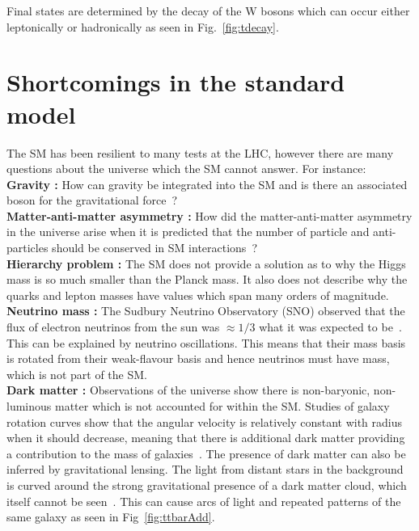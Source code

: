 Final states are determined by the decay of the W bosons which can occur either leptonically or hadronically as seen in Fig.~\ref{fig:tdecay}. 

\section{Shortcomings in the standard model ~\label{sec:SMprobs}}
The SM has been resilient to many tests at the LHC, however there are many questions about the universe which the SM cannot answer. For instance:\\
{\bf Gravity :} How can gravity be integrated into the SM and is there an associated boson for the gravitational force~\cite{PhysRevLett.107.171101,PhysRevD.82.122001}? \\
{\bf Matter-anti-matter asymmetry :} How did the matter-anti-matter asymmetry in the universe arise when it is predicted that the number of particle and anti-particles should be conserved in SM interactions~\cite{RevModPhys.76.1}?\\
{\bf Hierarchy problem :} The SM does not provide a solution as to why the Higgs mass is so much smaller than the Planck mass. It also does not describe why the quarks and lepton masses have values which span many orders of magnitude.\\
{\bf Neutrino mass :}
The Sudbury Neutrino Observatory (SNO) observed that the flux of electron neutrinos from the sun was $\approx 1/3$ what it was expected to be~\cite{PhysRevC.88.025501}. This can be explained by neutrino oscillations. This means that their mass basis is rotated from their weak-flavour basis and hence neutrinos must have mass, which is not part of the SM.\\
{\bf Dark matter :} Observations of the universe show there is non-baryonic, non-luminous matter which is not accounted for within the SM. Studies of galaxy rotation curves show that the angular velocity is relatively constant with radius when it should decrease, meaning that there is additional dark matter providing a contribution to the mass of galaxies~\cite{Volders,
Jog:2002dg,
Persic:1995ru}. The presence of dark matter can also be inferred by gravitational lensing. The light from distant stars in the background is curved around the strong gravitational presence of a dark matter cloud, which itself cannot be seen~\cite{Einstein,Ellis2010}. 
This can cause arcs of light and repeated patterns of the same galaxy as seen in Fig~\ref{fig:ttbarAdd}.
